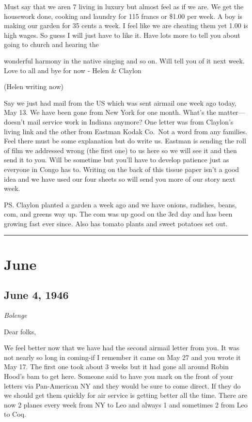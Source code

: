 \documentclass[
]{book}
\begin{document}
Must say that we aren 7 living in luxury but almost feel as if we are. We get the housework done, cooking and laundry for 115 francs or \$1.00 per week. A boy is making our garden for 35 cents a week. I feel like we are cheating them yet 1.00 is high wages. So guess I will just have to like it. Have lots more to tell you about going to church and hearing the

wonderful harmony in the native singing and so on. Will tell you of it next week. Love to all and bye for now - Helen \& Claylon

(Helen writing now)

Say we just had mail from the US which was sent airmail one week ago today, May 13. We have been gone from New York for one month. What's the matter---doesn't mail service work in Indiana anymore? One letter was from Claylon's living link and the other from Eastman Kodak Co.~Not a word from any families. Feel there must be some explanation but do write us. Eastman is sending the roll of film we addressed wrong (the first one) to us here so we will see it and then send it to you. Will be sometime but you'll have to develop patience just as everyone in Congo has to. Writing on the back of this tissue paper isn't a good idea and we have used our four sheets so will send you more of our story next week.

PS. Claylon planted a garden a week ago and we have onions, radishes, beans, com, and greens way up. The com was up good on the 3rd day and has been growing fast ever since. Also has tomato plants and sweet potatoes set out.

\begin{center}\rule{0.5\linewidth}{0.5pt}\end{center}

\hypertarget{june}{%
\section{June}\label{june}}

\hypertarget{june-4-1946}{%
\subsection{June 4, 1946}\label{june-4-1946}}

\emph{Bolenge}

Dear folks,

We feel better now that we have had the second airmail letter from you. It was not nearly so long in coming-if I remember it came on May 27 and you wrote it May 17. The first one took about 3 weeks but it had gone all around Robin Hood's bam to get here. Someone said to have you mark on the front of your letters via Pan-American NY and they would be sure to come direct. If they do we should get them quickly for air service is getting better all the time. There are now 2 planes every week from NY to Leo and always 1 and sometimes 2 from Leo to Coq.
\end{document}
